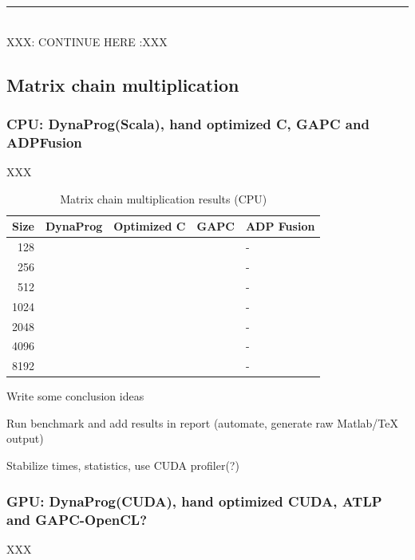 \newpage
{\center\color{red} \noindent\rule{16cm}{0.4pt} \\ XXX: CONTINUE HERE :XXX \\}
\subsection{Matrix chain multiplication}

\subsubsection{CPU: DynaProg(Scala), hand optimized C, GAPC and ADPFusion}
XXX

\begin{table}[H]\begin{center}\begin{tabular}{rllll}\toprule
\bf Size	& \bf DynaProg & \bf Optimized C & \bf GAPC & \bf ADP Fusion \\ \midrule
128		&		&		&		& -		\\
256		&		&		&		& -		\\
512		&		&		&		& -		\\
1024	&		&		&		& -		\\
2048	&		&		&		& -		\\
4096	&		&		&		& -		\\
8192	&		&		&		& -		\\ \bottomrule
\end{tabular}
\end{center}
\caption{Matrix chain multiplication results (CPU)}
\end{table}

{\color{red}\ol
\item Write some conclusion ideas
\item Run benchmark and add results in report (automate, generate raw Matlab/TeX output)
\item Stabilize times, statistics, use CUDA profiler(?)
\ole}

\subsubsection{GPU: DynaProg(CUDA), hand optimized CUDA, ATLP and GAPC-OpenCL?}
XXX

